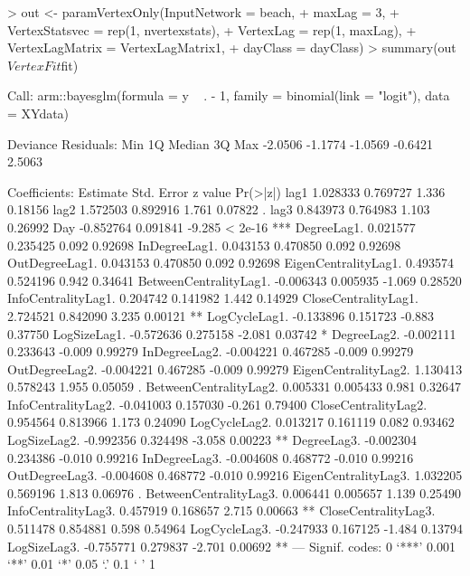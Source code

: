 \documentclass[12pt]{article}
\begin{document}
\begin{Schunk}
\begin{Sinput}
> out <- paramVertexOnly(InputNetwork = beach,
+                        maxLag = 3,
+                        VertexStatsvec = rep(1, nvertexstats),
+                        VertexLag = rep(1, maxLag),
+                        VertexLagMatrix = VertexLagMatrix1,
+                        dayClass = dayClass)
> summary(out$VertexFit$fit)
\end{Sinput}
\begin{Soutput}
Call:
arm::bayesglm(formula = y ~ . - 1, family = binomial(link = "logit"), 
    data = XYdata)

Deviance Residuals: 
    Min       1Q   Median       3Q      Max  
-2.0506  -1.1774  -1.0569  -0.6421   2.5063  

Coefficients:
                        Estimate Std. Error z value Pr(>|z|)    
lag1                    1.028333   0.769727   1.336  0.18156    
lag2                    1.572503   0.892916   1.761  0.07822 .  
lag3                    0.843973   0.764983   1.103  0.26992    
Day                    -0.852764   0.091841  -9.285  < 2e-16 ***
DegreeLag1.             0.021577   0.235425   0.092  0.92698    
InDegreeLag1.           0.043153   0.470850   0.092  0.92698    
OutDegreeLag1.          0.043153   0.470850   0.092  0.92698    
EigenCentralityLag1.    0.493574   0.524196   0.942  0.34641    
BetweenCentralityLag1. -0.006343   0.005935  -1.069  0.28520    
InfoCentralityLag1.     0.204742   0.141982   1.442  0.14929    
CloseCentralityLag1.    2.724521   0.842090   3.235  0.00121 ** 
LogCycleLag1.          -0.133896   0.151723  -0.883  0.37750    
LogSizeLag1.           -0.572636   0.275158  -2.081  0.03742 *  
DegreeLag2.            -0.002111   0.233643  -0.009  0.99279    
InDegreeLag2.          -0.004221   0.467285  -0.009  0.99279    
OutDegreeLag2.         -0.004221   0.467285  -0.009  0.99279    
EigenCentralityLag2.    1.130413   0.578243   1.955  0.05059 .  
BetweenCentralityLag2.  0.005331   0.005433   0.981  0.32647    
InfoCentralityLag2.    -0.041003   0.157030  -0.261  0.79400    
CloseCentralityLag2.    0.954564   0.813966   1.173  0.24090    
LogCycleLag2.           0.013217   0.161119   0.082  0.93462    
LogSizeLag2.           -0.992356   0.324498  -3.058  0.00223 ** 
DegreeLag3.            -0.002304   0.234386  -0.010  0.99216    
InDegreeLag3.          -0.004608   0.468772  -0.010  0.99216    
OutDegreeLag3.         -0.004608   0.468772  -0.010  0.99216    
EigenCentralityLag3.    1.032205   0.569196   1.813  0.06976 .  
BetweenCentralityLag3.  0.006441   0.005657   1.139  0.25490    
InfoCentralityLag3.     0.457919   0.168657   2.715  0.00663 ** 
CloseCentralityLag3.    0.511478   0.854881   0.598  0.54964    
LogCycleLag3.          -0.247933   0.167125  -1.484  0.13794    
LogSizeLag3.           -0.755771   0.279837  -2.701  0.00692 ** 
---
Signif. codes:  0 ‘***’ 0.001 ‘**’ 0.01 ‘*’ 0.05 ‘.’ 0.1 ‘ ’ 1


\end{Soutput}
\end{Schunk}
\end{document}
